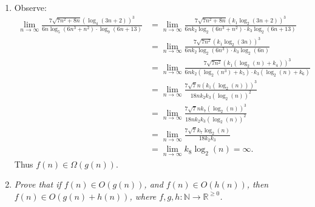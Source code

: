 \documentclass[10pt,oneside,reqno]{amsart}
\theoremstyle{plain}
\theoremstyle{definition}
\begin{document}
\begin{enumerate}[label=\arabic*.]
\begin{proof}
Note 
\begin{equation}
\begin{aligned}
3\sqrt{2n^5 - 2n^3 + 23} \leq 3\sqrt{2n^5 - 2n^5 + 23n^5} = 3\sqrt{23n^5} = 3\sqrt{23}n^{2.5}. 
\end{aligned}
\end{equation}
And also
\begin{equation}
\begin{aligned}
3\sqrt{2n^5 - 2n^3 + 23} \geq 3\sqrt{2n^5} = 3\sqrt{2}n^{2.5}. 
\end{aligned}
\end{equation}
So we have 
\begin{equation}
\begin{aligned}
3\sqrt{2}n^{2.5}\leq 3\sqrt{2n^5 - 2n^3 + 23} \leq 3\sqrt{23}n^{2.5},
\end{aligned}
\end{equation}
where $3\sqrt{2} < 3\sqrt{23}$, so we must have that $3\sqrt{2n^5 - 2n^3 + 23} \in \Theta(n^{2.5})$. 
\end{proof}

\item  Observe: 
\begin{equation}
\begin{aligned}
\lim_{n \to \infty} \frac{7 \sqrt{7n^2 + 8n}(\log_4(3n + 2))^3}{6n\log_5(6n^3 + n^2)\cdot \log_9(6n + 13)} &=\lim_{n \to \infty} \frac{7 \sqrt{7n^2 + 8n}(k_1\log_2(3n + 2))^3}{6nk_2\log_2(6n^3 + n^2)\cdot k_3\log_2(6n + 13)}\\
&= \lim_{n \to \infty}\frac{7 \sqrt{7n^2}(k_1\log_2(3n))^3}{6nk_2\log_2(6n^3)\cdot k_3\log_2(6n)}\\
&= \lim_{n \to \infty} \frac{7 \sqrt{7n^2}(k_1(\log_2(n) + k_4))^3}{6nk_2(\log_2(n^3) + k_5)\cdot k_3(\log_2(n) + k_6)}\\
&= \lim_{n \to \infty} \frac{7 \sqrt{7}n(k_1(\log_2(n)))^3}{18nk_2k_3(\log_2(n))^2}\\
&= \lim_{n \to \infty}\frac{7 \sqrt{7}nk_7(\log_2(n))^3}{18nk_2k_3(\log_2(n))^2}\\
&= \lim_{n \to \infty}\frac{7 \sqrt{7}k_7\log_2(n)}{18k_2k_3}\\
&=\lim_{n \to \infty} k_8\log_2(n) = \infty. 
\end{aligned}
\end{equation}
Thus $f(n) \in \Omega(g(n))$. \\

\item \textit{Prove that if $f(n) \in O(g(n))$, and $f(n) \in O(h(n))$, then $f(n) \in O(g(n) + h(n))$, where $f,g,h:\mathbb{N} \to \mathbb{R}^{\geq0}$.} 




\end{enumerate}
\end{document}

